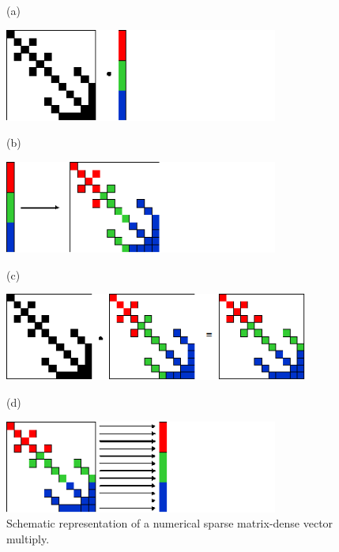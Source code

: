 %
\begin{figure}
(a)

\includegraphics[width=9cm]{sparse-a}

(b)

\includegraphics[width=9cm]{sparse-b}

(c)

\includegraphics[width=10cm]{sparse-c}

(d)

\includegraphics[width=9cm]{sparse-d}

\caption{\label{cap:SparseMatrix}Schematic representation of a numerical sparse
matrix-dense vector multiply.}

\end{figure}


